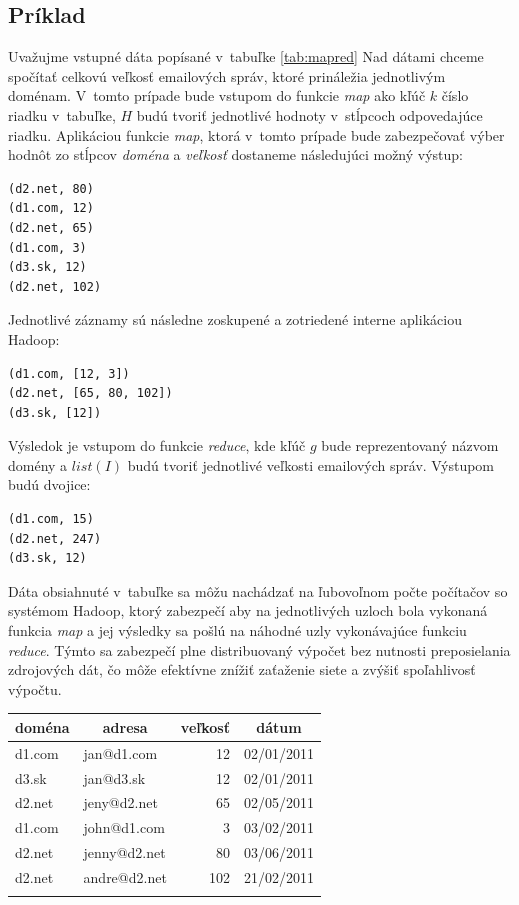 \documentclass[11pt,twoside,a4paper]{book}
\begin{document}
\subsection*{Príklad}

Uvažujme vstupné dáta popísané v~tabuľke \ref{tab:mapred} Nad dátami chceme spočítať celkovú veľkosť emailových správ, ktoré prináležia jednotlivým doménam. V~tomto prípade bude vstupom do funkcie \emph{map} ako kľúč $k$ číslo riadku v~tabuľke, $H$ budú tvoriť jednotlivé hodnoty v~stĺpcoch odpovedajúce riadku. Aplikáciou funkcie \emph{map}, ktorá v~tomto prípade bude zabezpečovať výber hodnôt zo stĺpcov \emph{doména} a \emph{veľkosť} dostaneme následujúci možný výstup:

\begin{verbatim}
(d2.net, 80)
(d1.com, 12)
(d2.net, 65)
(d1.com, 3)
(d3.sk, 12)
(d2.net, 102)
\end{verbatim}
\noindent
Jednotlivé záznamy sú následne zoskupené a zotriedené interne aplikáciou Hadoop:

\begin{verbatim}
(d1.com, [12, 3])
(d2.net, [65, 80, 102])
(d3.sk, [12])
\end{verbatim}
\noindent
Výsledok je vstupom do funkcie \emph{reduce}, kde kľúč $g$ bude reprezentovaný názvom domény a $list(I)$ budú tvoriť jednotlivé veľkosti emailových správ. Výstupom budú dvojice:

\begin{verbatim}
(d1.com, 15)
(d2.net, 247)
(d3.sk, 12)
\end{verbatim}

Dáta obsiahnuté v~tabuľke sa môžu nachádzať na ľubovoľnom počte počítačov so systémom Hadoop, ktorý zabezpečí aby na jednotlivých uzloch bola vykonaná funkcia \emph{map} a jej výsledky sa pošlú na náhodné uzly vykonávajúce funkciu \emph{reduce}. Týmto sa zabezpečí plne distribuovaný výpočet bez nutnosti preposielania zdrojových dát, čo môže efektívne znížiť zaťaženie siete a zvýšiť spoľahlivosť výpočtu.


{\centering%
\label{tab:001}\par\bigskip
\begin{tabular}{llrl}\toprule
  \multicolumn{1}{c}{doména} & \multicolumn{1}{c}{adresa} & \multicolumn{1}{c}{veľkosť} &\multicolumn{1}{c}{dátum}\\\midrule\addlinespace
    d1.com & jan@d1.com & 12 & 02/01/2011\\\addlinespace    
    d3.sk  & jan@d3.sk & 12 & 02/01/2011\\\addlinespace
    d2.net & jeny@d2.net & 65 & 02/05/2011\\\addlinespace
    d1.com & john@d1.com & 3 & 03/02/2011\\\addlinespace
    d2.net & jenny@d2.net & 80 & 03/06/2011\\\addlinespace
    d2.net & andre@d2.net & 102 & 21/02/2011\\\addlinespace
 \hline
\end{tabular}\\}
\label{tab:mapred}
\par\bigskip
\end{document}
